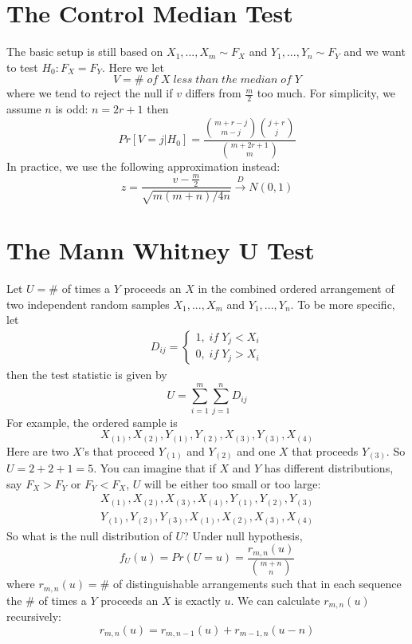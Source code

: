 \documentclass[twoside]{article}
\begin{document}
	\section{The Control Median Test}
	The basic setup is still based on $X_1, ..., X_m \sim F_X$ and $Y_1, ..., Y_n \sim F_Y$ and we want to test $H_0: F_X = F_Y$. Here we let
	$$
	V = \# \; of \; X \; less \; than \; the \; median \; of \; Y
	$$
	where we tend to reject the null if $v$ differs from $\frac{m}{2}$ too much. For simplicity, we assume $n$ is odd: $n = 2r+1$ then
	$$
	Pr \left[ V=j | H_0 \right] = \frac{\binom{m+r-j}{m-j} \binom{j+r}{j}}{\binom{m+2r+1}{m}}
	$$
	In practice, we use the following approximation instead: 
	$$
	z = \frac{v - \frac{m}{2}}{\sqrt{m(m+n)/4n}} \xrightarrow{D} N(0,1)
	$$
	
	\section{The Mann Whitney U Test}
	Let $U = \#$ of times a $Y$ proceeds an $X$ in the combined ordered arrangement of two independent random samples $X_1, ..., X_m$ and $Y_1, ..., Y_n$. To be more specific, let
	\begin{align*}
		D_{ij} = \begin{cases}
			1, \; if \; Y_j < X_i \\
			0, \; if \; Y_j > X_i
		\end{cases}
	\end{align*}
	then the test statistic is given by
	$$
	U = \sum_{i=1}^{m} \sum_{j=1}^{n} D_{ij}
	$$
	For example, the ordered sample is 
	$$
	X_{(1)}, X_{(2)}, Y_{(1)}, Y_{(2)}, X_{(3)}, Y_{(3)}, X_{(4)}
	$$
	Here are two $X$'s that proceed $Y_{(1)}$ and $Y_{(2)}$ and one $X$ that proceeds $Y_{(3)}$. So $U = 2+2+1=5$. You can imagine that if $X$ and $Y$ has different distributions, say $F_X > F_Y$ or $F_Y < F_X$, $U$ will be either too small or too large: 
	\begin{align*}
		X_{(1)}, X_{(2)}, X_{(3)}, X_{(4)}, Y_{(1)}, Y_{(2)}, Y_{(3)} \tag{U=0} \\
		Y_{(1)}, Y_{(2)}, Y_{(3)}, X_{(1)}, X_{(2)}, X_{(3)}, X_{(4)} \tag{U=12}
	\end{align*}
	So what is the null distribution of $U$? Under null hypothesis, 
	$$
	f_U(u) = Pr \left( U = u \right) = \frac{r_{m,n}(u)}{\binom{m+n}{n}}
	$$
	where $r_{m,n}(u)=\#$ of distinguishable arrangements such that in each sequence the $\#$ of times a $Y$ proceeds an $X$ is exactly $u$. We can calculate $r_{m,n}(u)$ recursively: 
	$$
	r_{m,n}(u) = r_{m,n-1}(u) + r_{m-1,n}(u-n)
	$$
\end{document}
